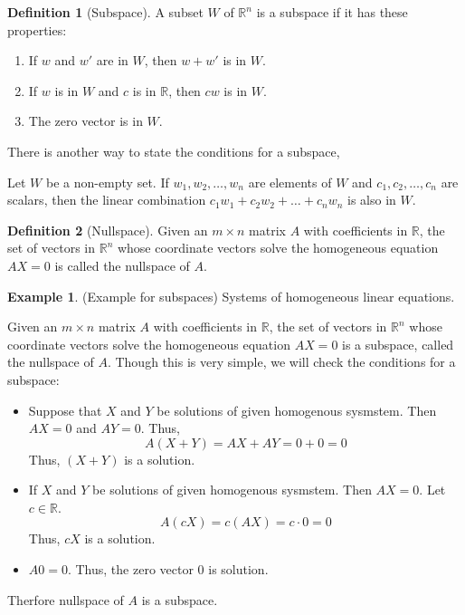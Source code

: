 \documentclass[
]{book}
\providecommand{\tightlist}{%
  \setlength{\itemsep}{0pt}\setlength{\parskip}{0pt}}
\theoremstyle{definition}
\newtheorem{definition}{Definition}[chapter]
\theoremstyle{definition}
\newtheorem{example}{Example}[chapter]
\theoremstyle{definition}
\theoremstyle{definition}
\theoremstyle{remark}
\begin{document}
\begin{definition}[Subspace]
\protect\hypertarget{def:unnamed-chunk-64}{}\label{def:unnamed-chunk-64}A subset \(W\) of \(\mathbb{R}^n\) is a subspace if it has these properties:

\begin{enumerate}
\def\labelenumi{\alph{enumi}.}
\tightlist
\item
  If \(w\) and \(w'\) are in \(W\), then \(w + w'\) is in \(W\).
\item
  If \(w\) is in \(W\) and \(c\) is in \(\mathbb{R}\), then \(cw\) is in \(W\).
\item
  The zero vector is in \(W\).
\end{enumerate}

There is another way to state the conditions for a subspace,

Let \(W\) be a non-empty set. If \(w_1, w_2, \ldots, w_n\) are elements of \(W\) and \(c_1, c_2, \ldots, c_n\) are scalars, then the linear combination \(c_1w_1 + c_2w_2 + \ldots + c_nw_n\) is also in \(W\).
\end{definition}

\begin{definition}[Nullspace]
\protect\hypertarget{def:unnamed-chunk-65}{}\label{def:unnamed-chunk-65}Given an \(m \times n\) matrix \(A\) with coefficients in \(\mathbb{R}\), the set of vectors in \(\mathbb{R}^n\) whose coordinate vectors solve the homogeneous equation \(AX = 0\) is called the nullspace of \(A\).
\end{definition}

\begin{example}
\protect\hypertarget{exm:unnamed-chunk-66}{}\label{exm:unnamed-chunk-66}(Example for subspaces) Systems of homogeneous linear equations.

Given an \(m \times n\) matrix \(A\) with coefficients in \(\mathbb{R}\), the set of vectors in \(\mathbb{R}^n\) whose coordinate vectors solve the homogeneous equation \(AX = 0\) is a subspace, called the nullspace of \(A\). Though this is very simple, we will check the conditions for a subspace:

\begin{itemize}
\tightlist
\item
  Suppose that \(X\) and \(Y\) be solutions of given homogenous sysmstem. Then \(AX=0\) and \(AY=0\). Thus,
  \[A(X+Y)=AX+AY=0+0=0\]
  Thus, \((X+Y)\) is a solution.
\item
  If \(X\) and \(Y\) be solutions of given homogenous sysmstem. Then \(AX=0\). Let \(c\in \mathbb{R}\).
  \[A(cX)=c(AX)=c\cdot 0=0\]
  Thus, \(cX\) is a solution.
\item
  \(A0=0\). Thus, the zero vector \(0\) is solution.
\end{itemize}

Therfore nullspace of \(A\) is a subspace.
\end{example}
\end{document}
